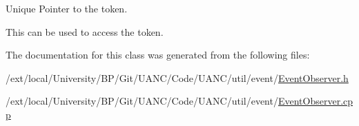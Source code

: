 Unique Pointer to the token. 

This can be used to access the token. 

The documentation for this class was generated from the following files\+:\begin{DoxyCompactItemize}
\item 
/ext/local/\+University/\+B\+P/\+Git/\+U\+A\+N\+C/\+Code/\+U\+A\+N\+C/util/event/\hyperlink{_event_observer_8h}{Event\+Observer.\+h}\item 
/ext/local/\+University/\+B\+P/\+Git/\+U\+A\+N\+C/\+Code/\+U\+A\+N\+C/util/event/\hyperlink{_event_observer_8cpp}{Event\+Observer.\+cpp}\end{DoxyCompactItemize}
